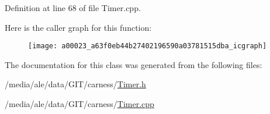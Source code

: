 Definition at line 68 of file Timer.\-cpp.



Here is the caller graph for this function\-:\nopagebreak
\begin{figure}[H]
\begin{center}
\leavevmode
\texttt{[image: a00023\_a63f0eb44b27402196590a03781515dba\_icgraph]}
\end{center}
\end{figure}




The documentation for this class was generated from the following files\-:\begin{DoxyCompactItemize}
\item 
/media/ale/data/\-G\-I\-T/carness/\hyperlink{a00047}{Timer.\-h}\item 
/media/ale/data/\-G\-I\-T/carness/\hyperlink{a00046}{Timer.\-cpp}\end{DoxyCompactItemize}
